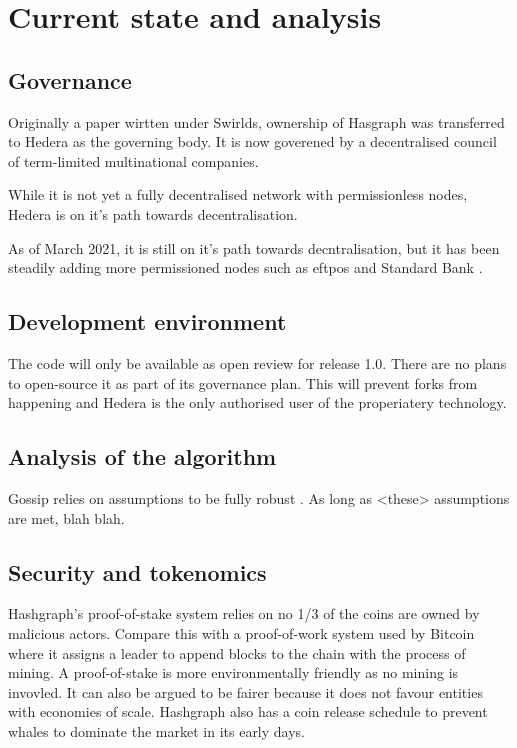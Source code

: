 \section{Current state and analysis}

\subsection{Governance}
Originally a paper wirtten under Swirlds, ownership of Hasgraph was transferred to Hedera as the governing body. \cite{baird2018hedera} It is now goverened by a decentralised council of term-limited multinational companies. 

While it is not yet a fully decentralised network with permissionless nodes, Hedera is on it's path towards decentralisation.

As of March 2021, it is still on it's path towards decntralisation, but it has been steadily adding more permissioned nodes such as eftpos and Standard Bank \cite{gentile2021hedera}.

\subsection{Development environment}
The code will only be available as open review for release 1.0. There are no plans to open-source it as part of its governance plan. This will prevent forks from happening and Hedera is the only authorised user of the properiatery technology.

\subsection{Analysis of the algorithm}
Gossip relies on assumptions to be fully robust \cite{alvisi}. As long as <these> assumptions are met, blah blah.

\subsection{Security and tokenomics}
Hashgraph's proof-of-stake system relies on no 1/3 of the coins are owned by malicious actors. Compare this with a proof-of-work system used by Bitcoin where it assigns a leader to append blocks to the chain with the process of mining. A proof-of-stake is more environmentally friendly as no mining is invovled. It can also be argued to be fairer because it does not favour entities with economies of scale. Hashgraph also has a coin release schedule to prevent whales to dominate the market in its early days.%

